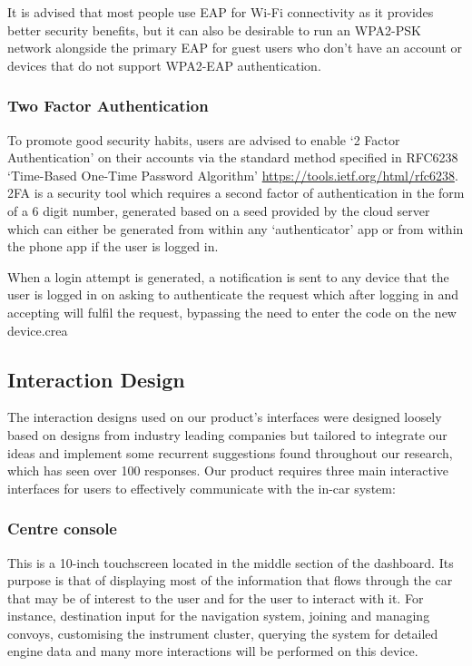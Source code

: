 \documentclass{article}
\begin{document}
\noindent It is advised that most people use EAP for Wi-Fi connectivity as it provides better security benefits, but it can also be desirable to run an WPA2-PSK network alongside the primary EAP for guest users who don't have an account or devices that do not support WPA2-EAP authentication.

\subsubsection{Two Factor Authentication}
To promote good security habits, users are advised to enable `2 Factor Authentication' on their accounts via the standard method specified in RFC6238 `Time-Based One-Time Password Algorithm' \url{https://tools.ietf.org/html/rfc6238}. 2FA is a security tool which requires a second factor of authentication in the form of a 6 digit number, generated based on a seed provided by the cloud server which can either be generated from within any `authenticator' app or from within the phone app if the user is logged in.

When a login attempt is generated, a notification is sent to any device that the user is logged in on asking to authenticate the request which after logging in and accepting will fulfil the request, bypassing the need to enter the code on the new device.crea

\subsection{Interaction Design}\label{ssec:interaction-design} %
The interaction designs used on our product's interfaces were designed loosely based on designs from industry leading companies but tailored to integrate our ideas and implement some recurrent suggestions found throughout our research, which has seen over 100 responses. Our product requires three main interactive interfaces for users to effectively communicate with the in-car system:

\subsubsection{Centre console}\label{sssec:centre-console}
This is a 10-inch touchscreen located in the middle section of the dashboard. Its purpose is that of displaying most of the information that flows through the car that may be of interest to the user and for the user to interact with it. For instance, destination input for the navigation system, joining and managing convoys, customising the instrument cluster, querying the system for detailed engine data and many more interactions will be performed on this device.
\end{document}
